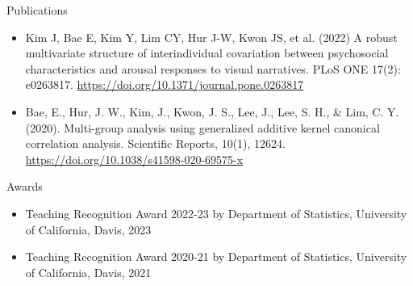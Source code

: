 \documentclass[11pt]{letter}
\begin{document}
{\Large Publications}

\begin{itemize} 
 	\item Kim J, Bae E, Kim Y, Lim CY, Hur J-W, Kwon JS, et al. (2022) A robust multivariate structure of interindividual covariation between psychosocial characteristics and arousal responses to visual narratives. PLoS ONE 17(2): e0263817. \href{https://doi.org/10.1371/journal.pone.0263817 }{https://doi.org/10.1371/journal.pone.0263817 }
	\item Bae, E., Hur, J. W., Kim, J., Kwon, J. S., Lee, J., Lee, S. H., \& Lim, C. Y. (2020). Multi-group analysis using generalized additive kernel canonical correlation analysis. Scientific Reports, 10(1), 12624. \href{https://doi.org/10.1038/s41598-020-69575-x}{https://doi.org/10.1038/s41598-020-69575-x}
\end{itemize} 

{\Large Awards}

\begin{itemize} 
 	\item Teaching Recognition Award 2022-23 by Department of Statistics, University of California, Davis, 2023
	\item Teaching Recognition Award 2020-21 by Department of Statistics, University of California, Davis, 2021
\end{itemize} 
\end{document}
